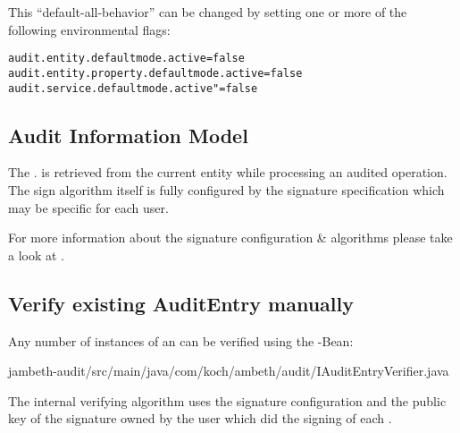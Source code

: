 This ``default-all-behavior'' can be changed by setting one or more of the following environmental flags:
\begin{lstlisting}[style=Props]
audit.entity.defaultmode.active=false
audit.entity.property.defaultmode.active=false
audit.service.defaultmode.active"=false
\end{lstlisting}

\subsection{Audit Information Model}

\def\showimgref{img/gen/2014-10-04-DeK-Ambeth-Audit-3}

The . is retrieved from the current  entity while processing an audited operation. The sign algorithm itself is fully configured by the signature specification which may be specific for each user.


\def\showimgref{img/gen/2014-10-04-DeK-Ambeth-Audit-4}

For more information about the signature configuration \& algorithms please take a look at .

\subsection{Verify existing AuditEntry manually}
Any number of instances of an  can be verified using the -Bean:

	{jambeth-audit/src/main/java/com/koch/ambeth/audit/IAuditEntryVerifier.java}

The internal verifying algorithm uses the signature configuration and the public key of the signature owned by the user which did the signing of each .

